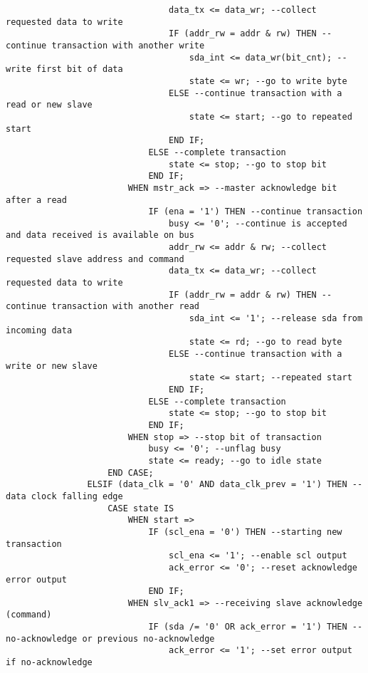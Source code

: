 \begin{lstlisting}
                                data_tx <= data_wr; --collect requested data to write
                                IF (addr_rw = addr & rw) THEN --continue transaction with another write
                                    sda_int <= data_wr(bit_cnt); --write first bit of data
                                    state <= wr; --go to write byte
                                ELSE --continue transaction with a read or new slave
                                    state <= start; --go to repeated start
                                END IF;
                            ELSE --complete transaction
                                state <= stop; --go to stop bit
                            END IF;
                        WHEN mstr_ack => --master acknowledge bit after a read
                            IF (ena = '1') THEN --continue transaction
                                busy <= '0'; --continue is accepted and data received is available on bus
                                addr_rw <= addr & rw; --collect requested slave address and command
                                data_tx <= data_wr; --collect requested data to write
                                IF (addr_rw = addr & rw) THEN --continue transaction with another read
                                    sda_int <= '1'; --release sda from incoming data
                                    state <= rd; --go to read byte
                                ELSE --continue transaction with a write or new slave
                                    state <= start; --repeated start
                                END IF; 
                            ELSE --complete transaction
                                state <= stop; --go to stop bit
                            END IF;
                        WHEN stop => --stop bit of transaction
                            busy <= '0'; --unflag busy
                            state <= ready; --go to idle state
                    END CASE; 
                ELSIF (data_clk = '0' AND data_clk_prev = '1') THEN --data clock falling edge
                    CASE state IS
                        WHEN start => 
                            IF (scl_ena = '0') THEN --starting new transaction
                                scl_ena <= '1'; --enable scl output
                                ack_error <= '0'; --reset acknowledge error output
                            END IF;
                        WHEN slv_ack1 => --receiving slave acknowledge (command)
                            IF (sda /= '0' OR ack_error = '1') THEN --no-acknowledge or previous no-acknowledge
                                ack_error <= '1'; --set error output if no-acknowledge

\end{lstlisting}
